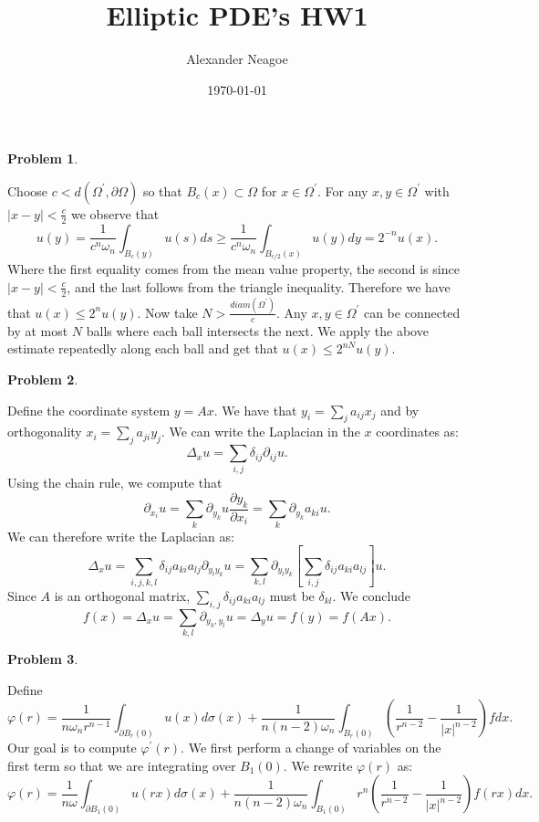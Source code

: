 \documentclass[12pt, a4paper]{article}
\title{Elliptic PDE's HW1}
\author{Alexander Neagoe }
\date{\today}
\newtheorem{problem}{Problem}
\theoremstyle{definition}
\newcommand{\bd}{\partial}
\begin{document}
\maketitle

\begin{problem}
\end{problem}
Choose $c < d(\Omega^\prime, \bd \Omega)$ so that $B_c(x) \subset \Omega$ for $x\in \Omega^\prime$. For any $x,y \in \Omega^\prime$ with $|x-y|< \frac{c}{2}$ we observe that
$$u(y) = \frac{1}{c^n \omega_n} \int_{B_c(y)} u(s)ds \geq \frac{1}{c^n \omega_n} \int_{B_{c/2}(x)} u(y)dy = 2^{-n}u(x).$$
Where the first equality comes from the mean value property, the second is since $|x-y|< \frac{c}{2}$, and the last follows from the triangle inequality. Therefore we have that $u(x) \leq 2^n u(y)$.
Now take $N> \frac{diam(\Omega^\prime)}{c}$. 
Any $x,y\in \Omega^\prime $ can be connected by at most $N$ balls where each ball intersects the next. We apply the above estimate repeatedly along each ball and get that $u(x) \leq2^{nN}u(y)$. 
\newpage
\begin{problem}
\end{problem}
Define the coordinate system $y = Ax$. We have that $y_i = \sum_j a_{ij}x_j$ and by orthogonality $x_i = \sum_{j} a_{ji}y_j$. We can write the Laplacian in the $x$ coordinates as: 
$$\Delta_x u = \sum_{i ,j} \delta_{ij} \partial_{ij}u.$$
Using the chain rule, we compute that 
$$\partial_{x_i} u = \sum_k \partial_{y_k}u \frac{\partial y_k}{\partial x_i} = \sum_k \partial_{y_k} a_{ki}u.$$
We can therefore write the Laplacian as: 
$$\Delta_x u = \sum_{i,j,k , l} \delta_{ij} a_{ki}a_{lj} \partial_{y_l y_k} u = \sum_{k, l} \partial_{y_l y_k} \left[ \sum_{i,j}\delta_{ij} a_{ki}a_{lj} \right]u.$$
Since $A$ is an orthogonal matrix, $\sum_{i,j}\delta_{ij} a_{ki}a_{lj}$ must be $\delta_{kl}.$
We conclude
$$f(x) = \Delta_x u = \sum_{k,l} \partial_{y_k,y_l}u = \Delta_y u = f(y) = f(Ax).$$
\newpage
\begin{problem}
\end{problem}
Define $$\varphi(r) = \frac{1}{n \omega_n r^{n-1}}\int_{\bd B_r(0)} u(x) d\sigma(x) + \frac{1}{n(n-2)\omega_n} \int_{B_r(0)} \left( \frac{1}{r^{n-2}} - \frac{1}{|x|^{n-2}}\right) f dx.$$
Our goal is to compute $\varphi^\prime(r)$. We first perform a change of variables on the first term so that we are integrating over $B_1(0)$. We rewrite $\varphi(r)$ as: 
$$\varphi(r) = \frac{1}{n\omega} \int_{\bd B_1(0)}u(rx) d \sigma(x) + \frac{1}{n(n-2)\omega_n} \int_{B_1(0)} r^n\left( \frac{1}{r^{n-2}} - \frac{1}{|x|^{n-2}}\right) f(rx)dx.$$
\end{document}
